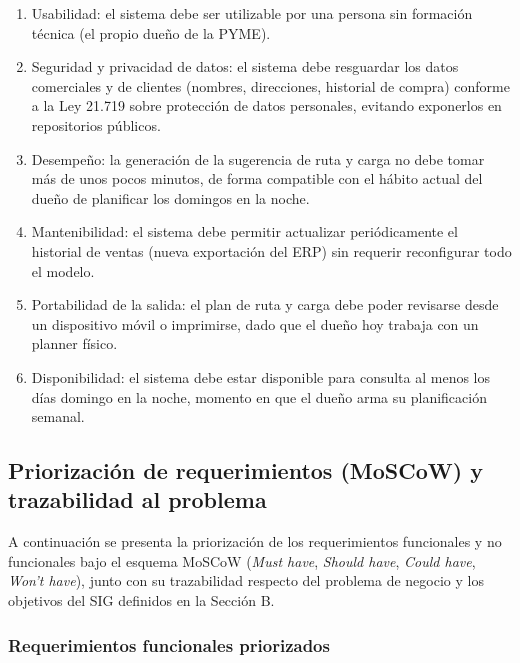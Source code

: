 \documentclass[10pt,a4paper]{article}
\begin{document}
\begin{enumerate}[leftmargin=1.5cm, itemsep=0.4em]
    \item Usabilidad: el sistema debe ser utilizable por una persona sin formación técnica (el propio dueño de la PYME).
    \item Seguridad y privacidad de datos: el sistema debe resguardar los datos comerciales y de clientes (nombres, direcciones, historial de compra) conforme a la Ley 21.719 sobre protección de datos personales, evitando exponerlos en repositorios públicos.
    \item Desempeño: la generación de la sugerencia de ruta y carga no debe tomar más de unos pocos minutos, de forma compatible con el hábito actual del dueño de planificar los domingos en la noche.
    \item Mantenibilidad: el sistema debe permitir actualizar periódicamente el historial de ventas (nueva exportación del ERP) sin requerir reconfigurar todo el modelo.
    \item Portabilidad de la salida: el plan de ruta y carga debe poder revisarse desde un dispositivo móvil o imprimirse, dado que el dueño hoy trabaja con un planner físico.
    \item Disponibilidad: el sistema debe estar disponible para consulta al menos los días domingo en la noche, momento en que el dueño arma su planificación semanal.

\end{enumerate}
\subsection*{Priorización de requerimientos (MoSCoW) y trazabilidad al problema}

A continuación se presenta la priorización de los requerimientos funcionales y no
funcionales bajo el esquema MoSCoW (\textit{Must have}, \textit{Should have},
\textit{Could have}, \textit{Won't have}), junto con su trazabilidad respecto del
problema de negocio y los objetivos del SIG definidos en la Sección B.

\subsubsection*{Requerimientos funcionales priorizados}
\end{document}
